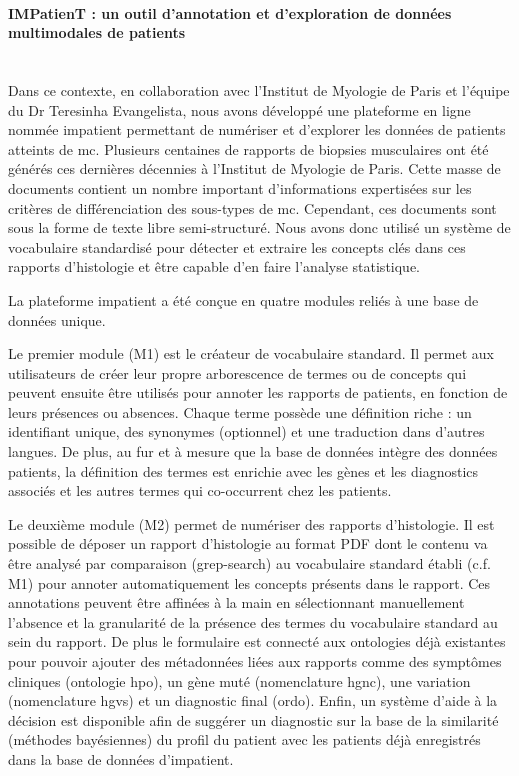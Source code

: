\paragraph{\textbf{IMPatienT : un outil d’annotation et d’exploration de données multimodales de patients}}\mbox{}\\

Dans ce contexte, en collaboration avec l’Institut de Myologie de Paris et l’équipe du Dr Teresinha Evangelista, nous avons développé une plateforme en ligne nommée \gls{impatient} permettant de numériser et d’explorer les données de patients atteints de \gls{mc}. Plusieurs centaines de rapports de biopsies musculaires ont été générés ces dernières décennies à l’Institut de Myologie de Paris. Cette masse de documents contient un nombre important d’informations expertisées sur les critères de différenciation des sous-types de \gls{mc}. Cependant, ces documents sont sous la forme de texte libre semi-structuré. Nous avons donc utilisé un système de vocabulaire standardisé pour détecter et extraire les concepts clés dans ces rapports d’histologie et être capable d’en faire l’analyse statistique.

La plateforme \gls{impatient} a été conçue en quatre modules reliés à une base de données unique. 

Le premier module (M1) est le créateur de vocabulaire standard. Il permet aux utilisateurs de créer leur propre arborescence de termes ou de concepts qui peuvent ensuite être utilisés pour annoter les rapports de patients, en fonction de leurs présences ou absences. Chaque terme possède une définition riche : un identifiant unique, des synonymes (optionnel) et une traduction dans d’autres langues. De plus, au fur et à mesure que la base de données intègre des données patients, la définition des termes est enrichie avec les gènes et les diagnostics associés et les autres termes qui co-occurrent chez les patients.

Le deuxième module (M2) permet de numériser des rapports d’histologie. Il est possible de déposer un rapport d’histologie au format PDF dont le contenu va être analysé par comparaison (grep-search) au vocabulaire standard établi (c.f. M1) pour annoter automatiquement les concepts présents dans le rapport. Ces annotations peuvent être affinées à la main en sélectionnant manuellement l’absence et la granularité de la présence des termes du vocabulaire standard au sein du rapport. De plus le formulaire est connecté aux ontologies déjà existantes pour pouvoir ajouter des métadonnées liées aux rapports comme des symptômes cliniques (ontologie \gls{hpo}), un gène muté (nomenclature \gls{hgnc}), une variation (nomenclature \gls{hgvs}) et un diagnostic final (\gls{ordo}). Enfin, un système d’aide à la décision est disponible afin de suggérer un diagnostic sur la base de la similarité (méthodes bayésiennes) du profil du patient avec les patients déjà enregistrés dans la base de données d’\gls{impatient}.


